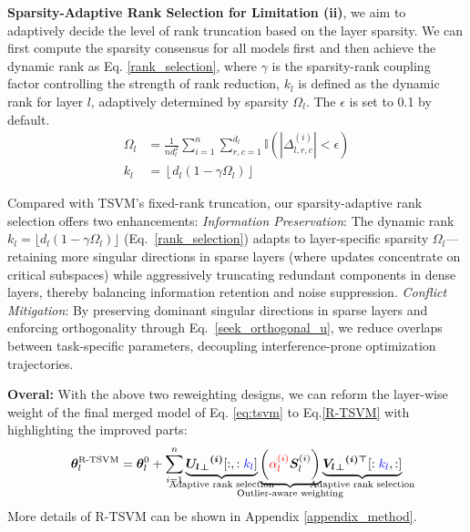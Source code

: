 \textbf{Sparsity-Adaptive Rank Selection for Limitation (ii)}, we aim to adaptively decide the level of rank truncation based on the layer sparsity. We can first compute the sparsity consensus for all models first and then achieve the dynamic rank as Eq. \ref{rank_selection}, where $\gamma$ is the sparsity-rank coupling factor controlling the strength of rank reduction, $k_l$ is defined as the dynamic rank for layer $l$, adaptively determined by sparsity $\Omega_l$. The $\epsilon$ is set to 0.1 by default.
\begin{align}
    \label{sparsity}
    \Omega_l &= \frac{1}{n d_l^2}\sum_{i=1}^n\sum_{r,c=1}^{d_l} \mathbb{I}\left(|\Delta_{l,r,c}^{(i)}| < \epsilon\right) \\
    \label{rank_selection}
    k_l      &= \left\lfloor d_l(1-\gamma \Omega_l) \right\rfloor
\end{align}

Compared with TSVM's fixed-rank truncation, our sparsity-adaptive rank selection offers two enhancements:
\emph{Information Preservation}: The dynamic rank $k_l = \lfloor d_l(1-\gamma \Omega_l)\rfloor$ (Eq.~\ref{rank_selection}) adapts to layer-specific sparsity $\Omega_l$—retaining more singular directions in sparse layers (where updates concentrate on critical subspaces) while aggressively truncating redundant components in dense layers, thereby balancing information retention and noise suppression.
\emph{Conflict Mitigation}: By preserving dominant singular directions in sparse layers and enforcing orthogonality through Eq.~\ref{seek_orthogonal_u}, we reduce overlaps between task-specific parameters, decoupling interference-prone optimization trajectories.



\textbf{Overal:} With the above two reweighting designs, we can reform the layer-wise weight of the final merged model of Eq. \ref{eq:tsvm} to Eq.\ref{R-TSVM} with highlighting the improved parts:
{
\footnotesize
\begin{equation}\label{R-TSVM}
    \bm{\theta}^{\text{R-TSVM}}_l =
    \bm{\theta}^{0}_{l} + \sum_{i=1}^n
    \underbrace{
        \bm{{{{U}_l}_\bot}^{(i)}}[:,:\textcolor{blue}{k_l}]
    }_{\mathclap{\text{Adaptive rank selection}}}
    \underbrace{
        \biggl(
        \textcolor{red}{\alpha^{(i)}_l}
        \bm{S}^{(i)}_l
        \biggr)
    }_{\mathclap{\text{Outlier-aware weighting}}}
    \underbrace{
        \bm{{{{V}_l}_\bot}^{(i)\top}}[:\textcolor{blue}{k_l},:]
    }_{\mathclap{\text{Adaptive rank selection}}}
\end{equation}
}
More details of R-TSVM can be shown in Appendix \ref{appendix_method}.


